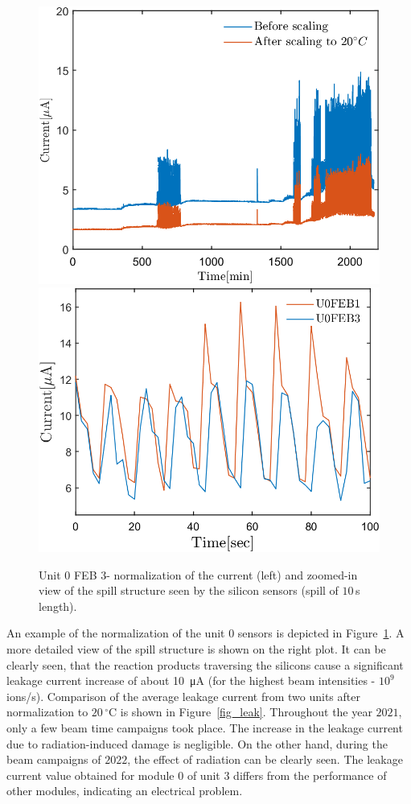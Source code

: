 \begin{figure}[!h]
\centering
\includegraphics[width=0.45\columnwidth]{Chapter6/DCS/images/uranium/current_U_highintensity.png}
\includegraphics[width=0.47\columnwidth]{Chapter6/DCS/images/uranium/U3L1_spill.png}
\caption{Unit $0$ \gls{FEB} $3$- normalization of the current (left) and zoomed-in view of the spill structure seen by the silicon sensors (spill of $10$\,s length).}
\label{fig_sensors_spill}
\end{figure}

An example of the normalization of the unit $0$ sensors is depicted in Figure~\ref{fig_sensors_spill}. A more detailed view of the spill structure is shown on the right plot. It can be clearly seen, that the reaction products traversing the silicons cause a significant leakage current increase of about \SI{10}{\micro A} (for the highest beam intensities - $10^{9}$ ions/s). Comparison of the average leakage current from two units after normalization to $20\,^{\circ}$C is shown in Figure~\ref{fig_leak}. Throughout the year $2021$, only a few beam time campaigns took place. The increase in the leakage current due to radiation-induced damage is negligible. On the other hand, during the beam campaigns of $2022$, the effect of radiation can be clearly seen. The leakage current value obtained for module $0$ of unit $3$ differs from the performance of other modules, indicating an electrical problem.

